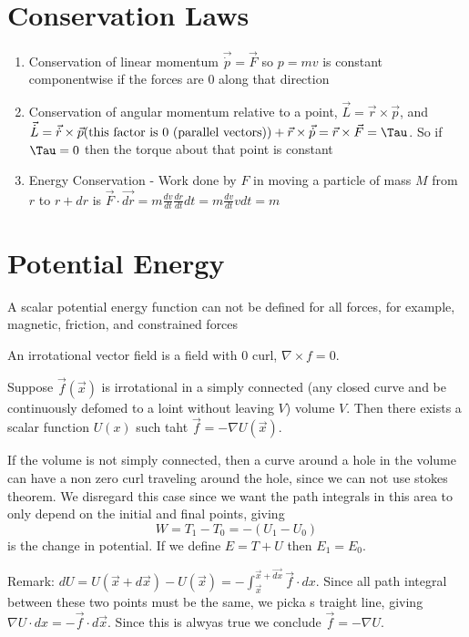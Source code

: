 \documentclass{homework}
\begin{document}
\section{Conservation Laws}

\begin{enumerate}
    \item {Conservation of linear momentum $\vec{\dot{p}} = \vec{F}$ so $p = mv$ is constant componentwise if the forces are $0$ along that direction}
    \item {Conservation of angular momentum relative to a point, $\vec{L} = \vec{r} \times \vec{p}$, and $\vec{\dot{L}} = \vec{\dot {r}} \times \vec{p} \text{(this factor is $0$ (parallel vectors))} + \vec{r} \times \vec{\dot {p}} = \vec{r} \times \vec{F} = \Tau$. So if $\Tau = 0$ then the torque about that point is constant}
    \item {Energy Conservation - Work done by $F$ in moving a particle of mass $M$ from $r$ to $r + dr$ is $\vec{F} \cdot \vec{dr} = m\frac{dv}{dt}\frac{dr}{dt} dt = m\frac{dv}{dt}vdt = m$}
    
\end{enumerate}



\section{Potential Energy}
A scalar potential energy function can not be defined for all forces, for example, magnetic, friction, and constrained forces

An irrotational vector field is a field with $0$ curl, $\nabla \times f = 0$. 

Suppose $\vec{f}(\vec{x})$ is irrotational in a simply connected (any closed curve and be continuously defomed to a loint without leaving $V$) volume $V$. Then there exists a scalar function $U(x)$ such taht $\vec{f} = - \nabla U(\vec{x})$.

If the volume is not simply connected, then a curve around a hole in the volume can have a non zero curl traveling around the hole, since we can not use stokes theorem. We disregard this case since we want the path integrals in this area to only depend on the initial and final points, giving 
\[W = T_1 - T_0 = -(U_1 - U_0)\]
is the change in potential. If we define $E = T + U$ then $E_1 = E_0$. 

Remark: $dU = U(\vec{x} + d\vec{x}) - U(\vec{x}) = -\int_{\vec{x}}^{\vec{x} + \vec{dx}}\vec{f}\cdot dx$. Since all path integral between these two points must be the same, we picka s traight line, giving $\nabla U \cdot dx = -\vec{f}\cdot d\vec{x}$. Since this is alwyas true we conclude $\vec{f} = - \nabla U$. 
\end{document}
